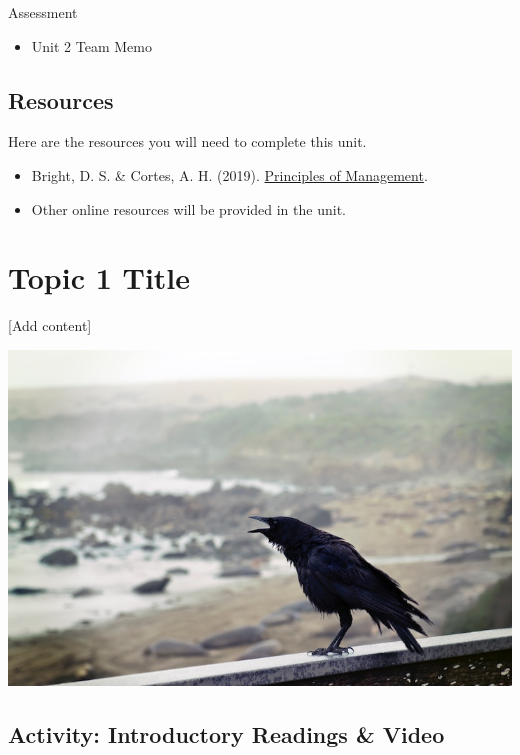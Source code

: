 \documentclass[
]{book}
\providecommand{\tightlist}{%
  \setlength{\itemsep}{0pt}\setlength{\parskip}{0pt}}
\begin{document}
\begin{assessment}
{Assessment}

\begin{itemize}
\tightlist
\item
  Unit 2 Team Memo
\end{itemize}
\end{assessment}

\hypertarget{resources-2}{%
\subsection*{Resources}\label{resources-2}}

Here are the resources you will need to complete this unit.

\begin{itemize}
\tightlist
\item
  Bright, D. S. \& Cortes, A. H. (2019). \href{https://openstax.org/details/books/principles-management}{Principles of Management}.\\
\item
  Other online resources will be provided in the unit.
\end{itemize}

\hypertarget{topic-1-title}{%
\section{Topic 1 Title}\label{topic-1-title}}

{[}Add content{]}

\includegraphics{assets/sample/crow.jpg}

\hypertarget{activity-introductory-readings-video}{%
\subsection*{Activity: Introductory Readings \& Video}\label{activity-introductory-readings-video}}
\end{document}
